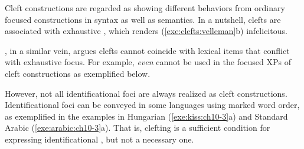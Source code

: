 Cleft constructions are regarded as showing different behaviors from
ordinary focused constructions in syntax as well as semantics. In a
nutshell, clefts are associated with exhaustive , which renders
(\ref{exe:clefts:velleman}b) infelicitous.


\noindent \citet{kim:12a}, in a similar vein, argues clefts cannot
coincide with lexical items that conflict with exhaustive focus. For
example, \textit{even} cannot be used in the focused XPs of cleft
constructions as exemplified below.



\noindent However, not all identificational foci are always realized
as cleft constructions. Identificational foci can be
conveyed in some languages using marked word order, as exemplified in
the examples in Hungarian (\ref{exe:kiss:ch10-3}a) and Standard Arabic
(\ref{exe:arabic:ch10-3}a).  That is, clefting is a sufficient
condition for expressing identificational , but not a necessary
one.








